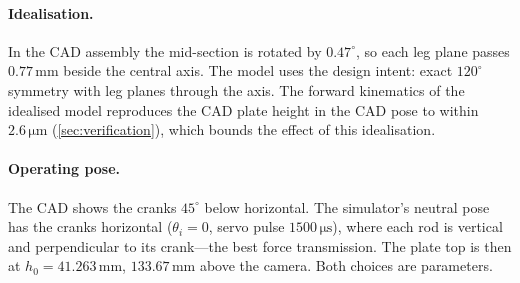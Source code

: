 \documentclass[10pt,a4paper]{article}
\newcommand{\un}[1]{\,\mathrm{#1}}
\begin{document}
\paragraph{Idealisation.} In the CAD assembly the mid-section is rotated by $0.47^\circ$, so
each leg plane passes $0.77\un{mm}$ beside the central axis. The model uses the design intent:
exact $120^\circ$ symmetry with leg planes through the axis. The forward kinematics of the
idealised model reproduces the CAD plate height in the CAD pose to within $2.6\un{\mu m}$
(\cref{sec:verification}), which bounds the effect of this idealisation.

\paragraph{Operating pose.} The CAD shows the cranks $45^\circ$ below horizontal. The simulator's
neutral pose has the cranks horizontal ($\theta_i=0$, servo pulse $1500\un{\mu s}$), where each
rod is vertical and perpendicular to its crank---the best force transmission. The plate top is
then at $h_0=41.263\un{mm}$, $133.67\un{mm}$ above the camera. Both choices are parameters.
\end{document}
